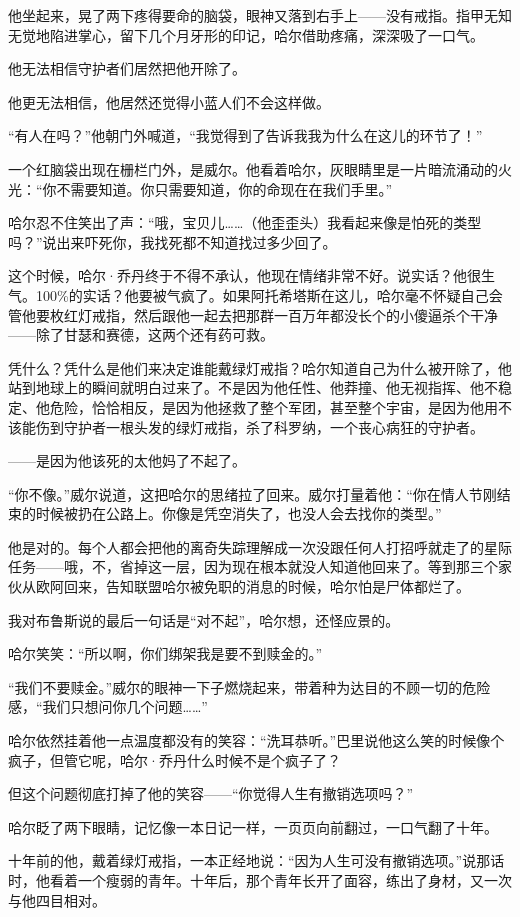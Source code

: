 \documentclass[../main]{subfiles}
\begin{document}
他坐起来，晃了两下疼得要命的脑袋，眼神又落到右手上——没有戒指。指甲无知无觉地陷进掌心，留下几个月牙形的印记，哈尔借助疼痛，深深吸了一口气。

他无法相信守护者们居然把他开除了。

他更无法相信，他居然还觉得小蓝人们不会这样做。

“有人在吗？”他朝门外喊道，“我觉得到了告诉我我为什么在这儿的环节了！”

一个红脑袋出现在栅栏门外，是威尔。他看着哈尔，灰眼睛里是一片暗流涌动的火光：“你不需要知道。你只需要知道，你的命现在在我们手里。”

哈尔忍不住笑出了声：“哦，宝贝儿……（他歪歪头）我看起来像是怕死的类型吗？”说出来吓死你，我找死都不知道找过多少回了。

这个时候，哈尔·乔丹终于不得不承认，他现在情绪非常不好。说实话？他很生气。100\%的实话？他要被气疯了。如果阿托希塔斯在这儿，哈尔毫不怀疑自己会管他要枚红灯戒指，然后跟他一起去把那群一百万年都没长个的小傻逼杀个干净——除了甘瑟和赛德，这两个还有药可救。

凭什么？凭什么是他们来决定谁能戴绿灯戒指？哈尔知道自己为什么被开除了，他站到地球上的瞬间就明白过来了。不是因为他任性、他莽撞、他无视指挥、他不稳定、他危险，恰恰相反，是因为他拯救了整个军团，甚至整个宇宙，是因为他用不该能伤到守护者一根头发的绿灯戒指，杀了科罗纳，一个丧心病狂的守护者。

——是因为他该死的太他妈了不起了。

“你不像。”威尔说道，这把哈尔的思绪拉了回来。威尔打量着他：“你在情人节刚结束的时候被扔在公路上。你像是凭空消失了，也没人会去找你的类型。”

他是对的。每个人都会把他的离奇失踪理解成一次没跟任何人打招呼就走了的星际任务——哦，不，省掉这一层，因为现在根本就没人知道他回来了。等到那三个家伙从欧阿回来，告知联盟哈尔被免职的消息的时候，哈尔怕是尸体都烂了。

我对布鲁斯说的最后一句话是“对不起”，哈尔想，还怪应景的。

哈尔笑笑：“所以啊，你们绑架我是要不到赎金的。”

“我们不要赎金。”威尔的眼神一下子燃烧起来，带着种为达目的不顾一切的危险感，“我们只想问你几个问题……”

哈尔依然挂着他一点温度都没有的笑容：“洗耳恭听。”巴里说他这么笑的时候像个疯子，但管它呢，哈尔·乔丹什么时候不是个疯子了？

但这个问题彻底打掉了他的笑容——“你觉得人生有撤销选项吗？”

哈尔眨了两下眼睛，记忆像一本日记一样，一页页向前翻过，一口气翻了十年。

十年前的他，戴着绿灯戒指，一本正经地说：“因为人生可没有撤销选项。”说那话时，他看着一个瘦弱的青年。十年后，那个青年长开了面容，练出了身材，又一次与他四目相对。
\end{document}
